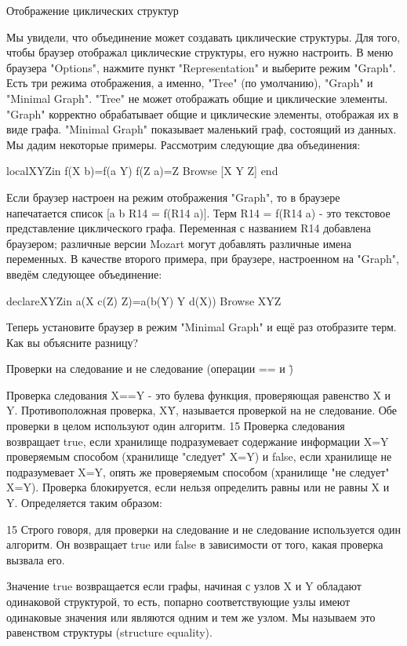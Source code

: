 Отображение циклических структур

Мы увидели, что объединение может создавать циклические структуры. Для того, чтобы браузер отображал циклические структуры, его нужно настроить. В меню браузера "Options", нажмите пункт "Representation" и выберите режим "Graph". Есть три режима отображения, а именно, "Tree" (по умолчанию), "Graph" и "Minimal Graph". "Tree" не может отображать общие и циклические элементы. "Graph" корректно обрабатывает общие и циклические элементы, отображая их в виде графа. "Minimal Graph" показывает маленький граф, состоящий из данных. Мы дадим некоторые примеры. Рассмотрим следующие два объединения:

localXYZin
f(X b)=f(a Y)
f(Z a)=Z
{Browse [X Y Z]}
end

Если браузер настроен на режим отображения "Graph", то в браузере напечатается список [a b R14 = f(R14 a)]. Терм R14 = f(R14 a) - это текстовое представление циклического графа. Переменная с названием R14 добавлена браузером; различные версии Mozart могут добавлять различные имена переменных. В качестве второго примера, при браузере, настроенном на "Graph", введём следующее объединение:

declareXYZin
a(X c(Z) Z)=a(b(Y) Y d(X))
{Browse XYZ}

Теперь установите браузер в режим "Minimal Graph" и ещё раз отобразите терм. Как вы объясните разницу?

Проверки на следование и не следование (операции == и \=)

Проверка следования X==Y - это булева функция, проверяющая равенство X и Y. Противоположная проверка, X\=Y, называется проверкой на не следование. Обе проверки в целом используют один алгоритм. 15 Проверка следования возвращает true, если хранилище подразумевает содержание информации X=Y проверяемым способом (хранилище "следует" X=Y) и false, если хранилище не подразумевает X=Y, опять же проверяемым способом (хранилище "не следует" X=Y). Проверка блокируется, если нельзя определить равны или не равны X и Y. Определяется таким образом:

15 Строго говоря, для проверки на следование и не следование используется один алгоритм. Он возвращает true или false в зависимости от того, какая проверка вызвала его.

Значение true возвращается если графы, начиная с узлов X и Y обладают одинаковой структурой, то есть, попарно соответствующие узлы имеют одинаковые значения или являются одним и тем же узлом. Мы называем это равенством структуры (structure equality).

